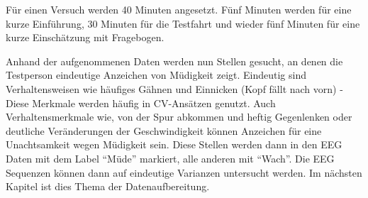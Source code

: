 Für einen Versuch werden 40 Minuten angesetzt. Fünf Minuten werden für eine kurze Einführung, 30 Minuten für die Testfahrt und wieder fünf Minuten für eine kurze Einschätzung mit Fragebogen.

Anhand der aufgenommenen Daten werden nun Stellen gesucht, an denen die Testperson eindeutige Anzeichen von Müdigkeit zeigt. Eindeutig sind Verhaltensweisen wie häufiges Gähnen und Einnicken (Kopf fällt nach vorn) - Diese Merkmale werden häufig in CV-Ansätzen genutzt. 
Auch Verhaltensmerkmale wie, von der Spur abkommen und heftig Gegenlenken oder deutliche Veränderungen der Geschwindigkeit können Anzeichen für eine Unachtsamkeit wegen Müdigkeit sein.
Diese Stellen werden dann in den EEG Daten mit dem Label "`Müde"' markiert, alle anderen mit "`Wach"'. Die EEG Sequenzen können dann auf eindeutige Varianzen untersucht werden. Im nächsten Kapitel ist dies Thema der  Datenaufbereitung.